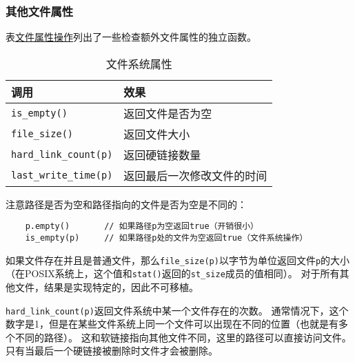 \subsubsection{其他文件属性}
表\hyperref[t20.11]{文件属性操作}列出了一些检查额外文件属性的独立函数。
\begin{table}[htb]
    \centering
    \begin{tabular}{l|l}
        \hline
        \textbf{调用}                   & \textbf{效果}   \\
        \hline
        \texttt{is\_empty()}          & 返回文件是否为空      \\
        \texttt{file\_size()}         & 返回文件大小        \\
        \texttt{hard\_link\_count(p)} & 返回硬链接数量       \\
        \texttt{last\_write\_time(p)} & 返回最后一次修改文件的时间 \\
        \hline
    \end{tabular}
    \caption{文件系统属性}
    \label{t20.11}
\end{table}

注意路径是否为空和路径指向的文件是否为空是不同的：
\begin{lstlisting}
    p.empty()       // 如果路径p为空返回true（开销很小）
    is_empty(p)     // 如果路径p处的文件为空返回true（文件系统操作）
\end{lstlisting}
如果文件存在并且是普通文件，那么\texttt{file\_size(p)}以字节为单位返回文件\texttt{p}的大小
（在POSIX系统上，这个值和\texttt{stat()}返回的\texttt{st\_size}成员的值相同）。
对于所有其他文件，结果是实现特定的，因此不可移植。

\texttt{hard\_link\_count(p)}返回文件系统中某一个文件存在的次数。
通常情况下，这个数字是1，但是在某些文件系统上同一个文件可以出现在不同的位置（也就是有多个不同的路径）。
这和软链接指向其他文件不同，这里的路径可以直接访问文件。只有当最后一个硬链接被删除时文件才会被删除。

